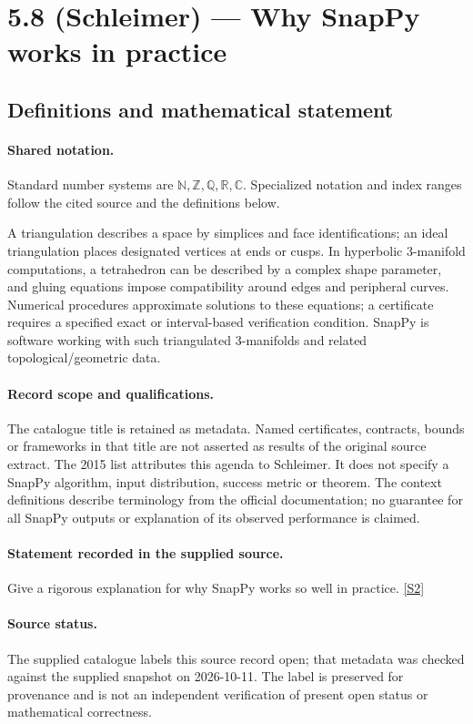 \documentclass[11pt]{article}
\newcommand{\sref}[2]{\hyperlink{source:#1:#2}{[S#2]}}
\begin{document}
\section{5.8 (Schleimer) — Why SnapPy works in practice}\label{statement}

\subsection{Definitions and mathematical statement}

\paragraph{Shared notation.}Standard number systems are $\mathbb N,\mathbb Z,\mathbb Q,\mathbb R,\mathbb C$. Specialized notation and index ranges follow the cited source and the definitions below.


A triangulation describes a space by simplices and face identifications; an ideal triangulation places designated vertices at ends or cusps. In hyperbolic $3$-manifold computations, a tetrahedron can be described by a complex shape parameter, and gluing equations impose compatibility around edges and peripheral curves. Numerical procedures approximate solutions to these equations; a certificate requires a specified exact or interval-based verification condition. SnapPy is software working with such triangulated $3$-manifolds and related topological/geometric data.
\paragraph{Record scope and qualifications.}
The catalogue title is retained as metadata. Named certificates, contracts, bounds or frameworks in that title are not asserted as results of the original source extract.
The 2015 list attributes this agenda to Schleimer. It does not specify a SnapPy algorithm, input distribution, success metric or theorem. The context definitions describe terminology from the official documentation; no guarantee for all SnapPy outputs or explanation of its observed performance is claimed.
\paragraph{Statement recorded in the supplied source.}
Give a rigorous explanation for why SnapPy works so well in practice. \sref{statement}{2}
\paragraph{Source status.}
The supplied catalogue labels this source record open; that metadata was checked against the supplied snapshot on 2026-10-11. The label is preserved for provenance and is not an independent verification of present open status or mathematical correctness.
\end{document}
